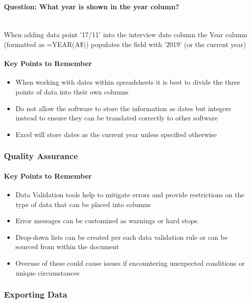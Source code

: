 \documentclass[12pt]{article}
\begin{document}
\paragraph{Question: What year is shown in the year column?} ~\\
When adding data point '17/11' into the interview date column the Year column (formatted as =YEAR(A\$)) populates the field with '2019' (or the current year)
\newline
\paragraph{Key Points to Remember}
\begin{itemize}
    \item When working with dates within spreadsheets it is best to divide the three points of data into their own columns
    \item Do not allow the software to store the information as dates but integers instead to ensure they can be translated correctly to other software
    \item Excel will store dates as the current year unless specified otherwise
\end{itemize}

\subsubsection{Quality Assurance}

\paragraph{Key Points to Remember}
\begin{itemize}
    \item Data Validation tools help to mitigate errors and provide restrictions on the type of data that can be placed into columns
    \item Error messages can be customized as warnings or hard stops.
    \item Drop-down lists can be created per each data validation rule or can be sourced from within the document
    \item Overuse of these could cause issues if encountering unexpected  conditions or unique circumstances 
\end{itemize}

\subsubsection{Exporting Data}
\end{document}
